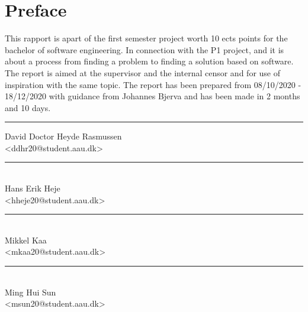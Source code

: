 \section*{Preface}%

This rapport is apart of the first semester project worth 10 ects points for the bachelor of software engineering. 
In connection with the P1 project, and it is about a process from finding a problem to finding a solution based on software. 
The report is aimed at the supervisor and the internal censor and for use of inspiration with the same topic. 
The report has been prepared from 08/10/2020 - 18/12/2020 with guidance from Johannes Bjerva and
has been made in 2 months and 10 days.

\vfill\noindent

\begin{center}
  \begin{minipage}[b]{0.45\textwidth}
    \centering
    \rule{\textwidth}{0.5pt}
     David Doctor Heyde Rasmussen\\
    {\footnotesize <ddhr20@student.aau.dk>}
   \end{minipage}
\hfill
\begin{minipage}[b]{0.45\textwidth}
  \centering
  \rule{\textwidth}{0.5pt}\\
   Hans Erik Heje\\
  {\footnotesize <hheje20@student.aau.dk>}
 \end{minipage}
\vspace{3\baselineskip}
\end{center}

\begin{center}
\begin{minipage}[b]{0.45\textwidth}
 \centering
 \rule{\textwidth}{0.5pt}\\
  Mikkel Kaa\\
 {\footnotesize <mkaa20@student.aau.dk>}
\end{minipage}
\hfill
\begin{minipage}[b]{0.45\textwidth}
 \centering
 \rule{\textwidth}{0.5pt}\\
  Ming Hui Sun\\
 {\footnotesize <msun20@student.aau.dk>}
\end{minipage}
\end{center}